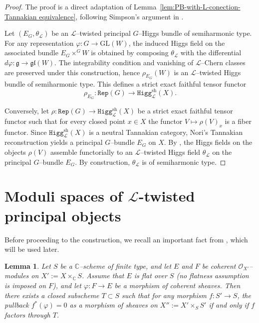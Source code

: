 \documentclass[12pt,reqno]{amsart}
\numberwithin{equation}{subsection}
\newtheorem{lem}[equation]{Lemma}
\theoremstyle{definition}
\theoremstyle{theorem}
\begin{document}
\begin{proof}
	The proof is a direct adaptation of
	Lemma~\eqref{lem:PB-with-L-conection-Tannakian equivalence}, following
	Simpson’s argument in \cite[\S\,9, Lemma~9.2]{CT.Simpson-1995}.
	
	Let $(E_G,\theta_{\mathcal L})$ be an $\mathcal L$--twisted principal
	$G$--Higgs bundle of semiharmonic type. For any representation
	$\varphi:G\to \mathrm{GL}(W)$, the induced Higgs field on the associated
	bundle $E_G\times^G W$ is obtained by composing $\theta_{\mathcal L}$ with the differential $d\varphi:\mathfrak g\to\mathfrak{gl}(W)$. The integrability condition and vanishing of $\mathcal L$--Chern classes are preserved under this construction, hence $\rho_{E_G}(W)$ is an $\mathcal L$--twisted Higgs bundle of semiharmonic type. This defines a strict exact faithful tensor functor
	\[
	\rho_{E_G}:\texttt{Rep}(G)\longrightarrow
	\texttt{Higg}^{\mathrm{sh}}_{\mathcal L}(X).
	\]
	
	Conversely, let $\rho:\texttt{Rep}(G)\to
	\texttt{Higg}^{\mathrm{sh}}_{\mathcal L}(X)$ be a strict exact faithful
	tensor functor such that for every closed point $x\in X$ the functor
	$V\mapsto \rho(V)_x$ is a fiber functor. Since
	$\texttt{Higg}^{\mathrm{sh}}_{\mathcal L}(X)$ is a neutral Tannakian
	category, Nori’s Tannakian reconstruction yields a principal $G$--bundle
	$E_G$ on $X$. By \cite[\S\,6, remark after Lemma~6.13]{CT. Simpson-1992}, the Higgs fields
	on the objects $\rho(V)$ assemble functorially to an
	$\mathcal L$--twisted Higgs field $\theta_{\mathcal L}$ on the principal $G$--bundle $E_G$. By construction, $\theta_{\mathcal L}$ is of semiharmonic type.
	
\end{proof}




\section{Moduli spaces of $\mathcal{L}$-twisted principal objects}

Before proceeding to the construction, we recall an important fact from
\cite[\S\,Proof of Thm.~3.8]{CT.Simpson-1994}, which will be used later.

\begin{lem}\label{lem:fact-from-simpson-thm-3-8}
	Let $S$ be a $\mathbb{C}$--scheme of finite type, and let
	$E$ and $F$ be coherent $\mathcal{O}_{X'}$--modules on
	$X' := X \times_{\mathbb{C}} S$.
	Assume that $E$ is flat over $S$ (no flatness assumption is imposed on $F$),
	and let $\varphi \colon F \to E$ be a morphism of coherent sheaves.
	Then there exists a closed subscheme $T \subset S$ such that for any morphism
	$f \colon S' \to S$, the pullback
	$f^*(\varphi)=0$ as a morphism of sheaves on
	$X'' := X' \times_S S'$ if and only if $f$ factors through $T$.
\end{lem}
\end{document}
